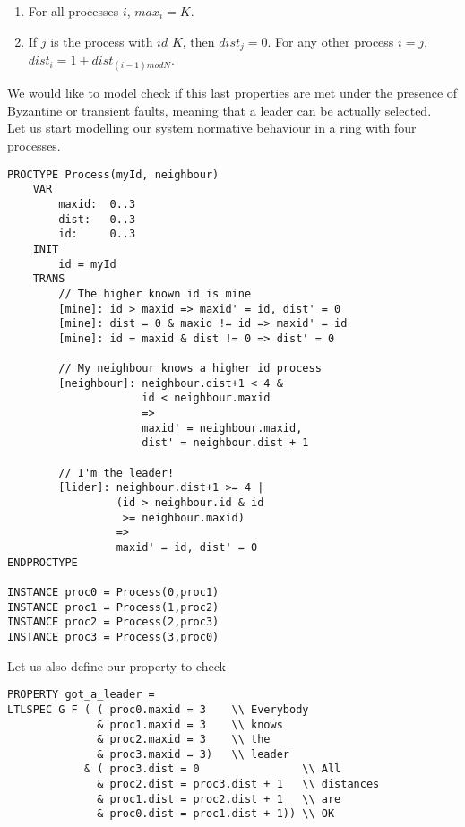 \documentclass{llncs2e/llncs}
\begin{document}
\begin{enumerate}
\item For all processes $i$, $max_i = K$.

\item If $j$ is the process with $id$ $K$, then $dist_j = 0$. For any other process $i = j$, $dist_i =
1 + dist_{(i-1) mod N}$.
\end{enumerate}
We would like to model check if this last properties are met under the presence of Byzantine or transient faults, meaning that a leader can be actually selected.\\
Let us start modelling our system normative behaviour in a ring with four processes.
\vspace{-0.3cm}
\begin{shaded}
\vspace{-0.5cm}
\begin{verbatim}
PROCTYPE Process(myId, neighbour)
    VAR
        maxid:  0..3
        dist:   0..3
        id:     0..3
    INIT
        id = myId
    TRANS
        // The higher known id is mine
        [mine]: id > maxid => maxid' = id, dist' = 0
        [mine]: dist = 0 & maxid != id => maxid' = id
        [mine]: id = maxid & dist != 0 => dist' = 0

        // My neighbour knows a higher id process
        [neighbour]: neighbour.dist+1 < 4 &
                     id < neighbour.maxid
                     =>
                     maxid' = neighbour.maxid,
                     dist' = neighbour.dist + 1

        // I'm the leader!
        [lider]: neighbour.dist+1 >= 4 | 
                 (id > neighbour.id & id 
                  >= neighbour.maxid)
                 =>
                 maxid' = id, dist' = 0
ENDPROCTYPE

INSTANCE proc0 = Process(0,proc1)
INSTANCE proc1 = Process(1,proc2)
INSTANCE proc2 = Process(2,proc3)
INSTANCE proc3 = Process(3,proc0)
\end{verbatim}
\vspace{-0.5cm}
\end{shaded}
\vspace{-0.2cm}
\noindent Let us also define our property to check
\vspace{-0.2cm}
\begin{shaded}
\vspace{-0.5cm}
\begin{verbatim}
PROPERTY got_a_leader =
LTLSPEC G F ( ( proc0.maxid = 3    \\ Everybody
              & proc1.maxid = 3    \\ knows
              & proc2.maxid = 3    \\ the
              & proc3.maxid = 3)   \\ leader
            & ( proc3.dist = 0                \\ All
              & proc2.dist = proc3.dist + 1   \\ distances
              & proc1.dist = proc2.dist + 1   \\ are
              & proc0.dist = proc1.dist + 1)) \\ OK
\end{verbatim}
\vspace{-0.5cm}
\end{shaded}
\end{document}
